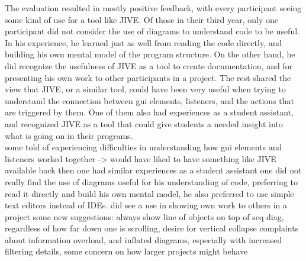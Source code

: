 The evaluation resulted in mostly positive feedback, with every participant seeing some kind of use for a tool like JIVE.
Of those in their third year, only one participant did not consider the use of diagrams to understand code to be useful.
In his experience, he learned just as well from reading the code directly, and building his own mental model of the program structure.
On the other hand, he did recognize the usefulness of JIVE as a tool to create documentation, and for presenting his own work to other participants in a project.
The rest shared the view that JIVE, or a similar tool, could have been very useful when trying to understand the connection between \gls{gui} elements, listeners, and the actions that are triggered by them.
One of them also had experiences as a student assistant, and recognized JIVE as a tool that could give students a needed insight into what is going on in their programs.
~\\


some told of experiencing difficulties in understanding how gui elements and listeners worked together -> would have liked to have something like JIVE available back then
one had similar experiences as a student assistant
one did not really find the use of diagrams useful for his understanding of code, preferring to read it directly and build his own mental model, he also preferred to use simple text editors instead of IDEs. did see a use in showing own work to others in a project
some new suggestions: always show line of objects on top of seq diag, regardless of how far down one is scrolling, desire for vertical collapse
complaints about information overload, and inflated diagrams, especially with increased filtering details, some concern on how larger projects might behave
